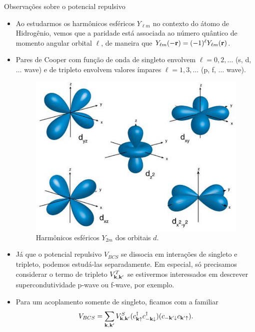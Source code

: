 \documentclass[8pt,aspectratio=169,xcolor={table,dvipsnames,usenames}]{beamer}
\begin{document}


\begin{frame}{Observações sobre o potencial repulsivo}

\begin{itemize}
\item Ao estudarmos os harmônicos esféricos $Y_{\ell m}$ no contexto do átomo de Hidrogênio, vemos que a paridade está associada ao número quântico de momento angular orbital $\ell$, de maneira que $Y_{\ell m}(-\vb{r}) = (-1)^\ell Y_{\ell m}(\vb{r})$.

\n

\item Pares de Cooper com função de onda de singleto envolvem $\ell = 0, 2, \ldots$ (s, d, $\ldots$ wave) e de tripleto envolvem valores ímpares $\ell = 1, 3, \ldots$ (p, f, $\ldots$ wave).

\begin{figure}[H]
\centering
\includegraphics[width=0.25\linewidth]{fig/d-orbitals.png}
\caption{Harmônicos esféricos $Y_{2m}$ dos orbitais $d$.}
\label{fig:d-orbitals}
\end{figure}

\item Já que o potencial repulsivo $V_{BCS}$ se dissocia em interações de singleto e tripleto, podemos estudá-las separadamente. Em especial, só precisamos considerar o termo de tripleto $V^T_{\vb{k},\vb{k}'}$ se estivermos interessados em descrever supercondutividade p-wave ou f-wave, por exemplo.

\n

\item Para um acoplamento somente de singleto, ficamos com a familiar
$$
V_{BCS} = \sum_{\vb{k},\vb{k}'} V_{\vb{k},\vb{k}'}^S (c_{\vb{k}\uparrow}^\dagger c_{-\vb{k}\downarrow}^\dagger) (c_{-\vb{k}'\downarrow} c_{\vb{k}'\uparrow}).
$$
\end{itemize}

\end{frame}


\end{document}
